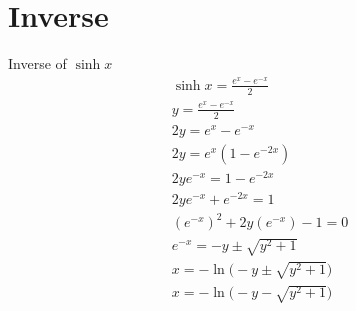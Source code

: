 \documentclass{article}
\theoremstyle{mytheoremstyle}
\theoremstyle{mytheoremstyle}
\theoremstyle{myproblemstyle}
\begin{document}
    \section*{Inverse}
    Inverse of $\sinh x$
    \begin{align*}
        \sinh x = \frac{e^x-e^{-x}}{2} \\
        y = \frac{e^x-e^{-x}}{2} \\
        2y = e^x-e^{-x} \\
        2y = e^x(1 - e^{-2x}) \\
        2ye^{-x} = 1 - e^{-2x} \\
        2ye^{-x} + e^{-2x} = 1 \\
        (e^{-x})^2 + 2y(e^{-x}) - 1 = 0 \\
        e^{-x} = -y \pm \sqrt{y^2+1} \\
        x = -\ln\big(-y \pm \sqrt{y^2+1}\big) \\
        x = -\ln\big(-y - \sqrt{y^2+1}\big) \\
    \end{align*}
\end{document}
